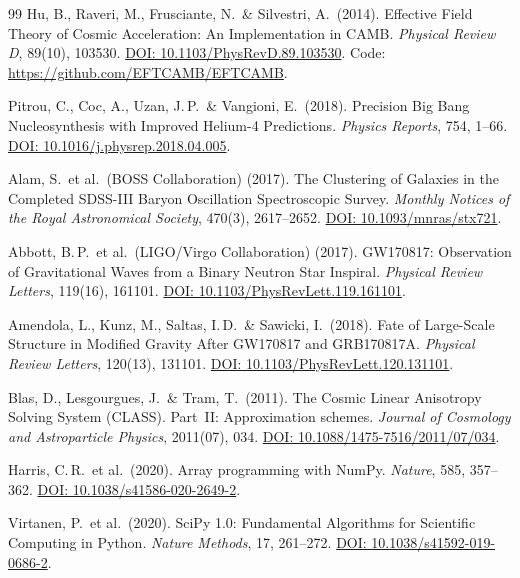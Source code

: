 \documentclass[aps,prd,twocolumn,superscriptaddress,nofootinbib,floatfix]{revtex4-2}
\begin{document}
\begin{thebibliography}{99}
Hu, B., Raveri, M., Frusciante, N.\ \& Silvestri, A.\ (2014).
Effective Field Theory of Cosmic Acceleration: An Implementation in CAMB.
\textit{Physical Review D}, 89(10), 103530.
\href{https://doi.org/10.1103/PhysRevD.89.103530}{DOI: 10.1103/PhysRevD.89.103530}. Code: \url{https://github.com/EFTCAMB/EFTCAMB}.

Pitrou, C., Coc, A., Uzan, J.\,P.\ \& Vangioni, E.\ (2018).
Precision Big Bang Nucleosynthesis with Improved Helium-4 Predictions.
\textit{Physics Reports}, 754, 1--66.
\href{https://doi.org/10.1016/j.physrep.2018.04.005}{DOI: 10.1016/j.physrep.2018.04.005}.

Alam, S.\ et al.\ (BOSS Collaboration) (2017).
The Clustering of Galaxies in the Completed SDSS-III Baryon Oscillation Spectroscopic Survey.
\textit{Monthly Notices of the Royal Astronomical Society}, 470(3), 2617--2652.
\href{https://doi.org/10.1093/mnras/stx721}{DOI: 10.1093/mnras/stx721}.

Abbott, B.\,P.\ et al.\ (LIGO/Virgo Collaboration) (2017).
GW170817: Observation of Gravitational Waves from a Binary Neutron Star Inspiral.
\textit{Physical Review Letters}, 119(16), 161101.
\href{https://doi.org/10.1103/PhysRevLett.119.161101}{DOI: 10.1103/PhysRevLett.119.161101}.

Amendola, L., Kunz, M., Saltas, I.\,D.\ \& Sawicki, I.\ (2018).
Fate of Large-Scale Structure in Modified Gravity After GW170817 and GRB170817A.
\textit{Physical Review Letters}, 120(13), 131101.
\href{https://doi.org/10.1103/PhysRevLett.120.131101}{DOI: 10.1103/PhysRevLett.120.131101}.

Blas, D., Lesgourgues, J.\ \& Tram, T.\ (2011).
The Cosmic Linear Anisotropy Solving System (CLASS). Part~II: Approximation schemes.
\textit{Journal of Cosmology and Astroparticle Physics}, 2011(07), 034.
\href{https://doi.org/10.1088/1475-7516/2011/07/034}{DOI: 10.1088/1475-7516/2011/07/034}.

Harris, C.\,R.\ et al.\ (2020).
Array programming with NumPy.
\textit{Nature}, 585, 357--362.
\href{https://doi.org/10.1038/s41586-020-2649-2}{DOI: 10.1038/s41586-020-2649-2}.

Virtanen, P.\ et al.\ (2020).
SciPy 1.0: Fundamental Algorithms for Scientific Computing in Python.
\textit{Nature Methods}, 17, 261--272.
\href{https://doi.org/10.1038/s41592-019-0686-2}{DOI: 10.1038/s41592-019-0686-2}.


\end{thebibliography}
\end{document}
